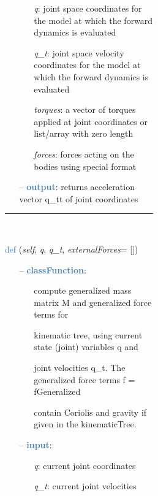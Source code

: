 \begin{itemize}[leftmargin=1.4cm]
\begin{itemize}[leftmargin=1.4cm]
\begin{itemize}[leftmargin=0.5cm]
\begin{itemize}[leftmargin=1.4cm]
\begin{itemize}[leftmargin=1.4cm]
\begin{itemize}[leftmargin=0.5cm]
\begin{itemize}[leftmargin=1.4cm]
\begin{itemize}[leftmargin=0.5cm]
\begin{itemize}[leftmargin=1.4cm]
\begin{itemize}[leftmargin=1.4cm]
\begin{itemize}[leftmargin=1.4cm]
\begin{itemize}[leftmargin=0.7cm]
\begin{itemize}[leftmargin=1.2cm]
\setlength{\itemindent}{-0.7cm}
\item[]{\it q}: joint space coordinates for the model at which the forward dynamics is evaluated
\item[]{\it q\_t}: joint space velocity coordinates for the model at which the forward dynamics is evaluated
\item[]{\it torques}: a vector of torques applied at joint coordinates or list/array with zero length
\item[]{\it forces}: forces acting on the bodies using special format
\end{itemize}
\item[--]\textcolor{steelblue}{\bf output}: returns acceleration vector q\_tt of joint coordinates
\vspace{12pt}\end{itemize}
%
\noindent\rule{8cm}{0.75pt}\vspace{1pt} \\ 
\begin{flushleft}
\noindent \textcolor{steelblue}{def {\bf {}}}\label{sec:kinematicTree:KinematicTree33:ComputeMassMatrixAndForceTerms}
({\it self}, {\it q}, {\it q\_t}, {\it externalForces}= [])
\end{flushleft}
\setlength{\itemindent}{0.7cm}
\begin{itemize}[leftmargin=0.7cm]
\item[--]\textcolor{steelblue}{\bf classFunction}: \vspace{-6pt}
\begin{itemize}[leftmargin=1.2cm]
\setlength{\itemindent}{-0.7cm}
\item[]compute generalized mass matrix M and generalized force terms for
\item[]kinematic tree, using current state (joint) variables q and
\item[]joint velocities q\_t. The generalized force terms f = fGeneralized
\item[]contain Coriolis and gravity if given in the kinematicTree.
\end{itemize}
\item[--]\textcolor{steelblue}{\bf input}: \vspace{-6pt}
\begin{itemize}[leftmargin=1.2cm]
\setlength{\itemindent}{-0.7cm}
\item[]{\it q}: current joint coordinates
\item[]{\it q\_t}: current joint velocities

\end{itemize}
\end{itemize}
\end{itemize}
\end{itemize}
\end{itemize}
\end{itemize}
\end{itemize}
\end{itemize}
\end{itemize}
\end{itemize}
\end{itemize}
\end{itemize}
\end{itemize}
